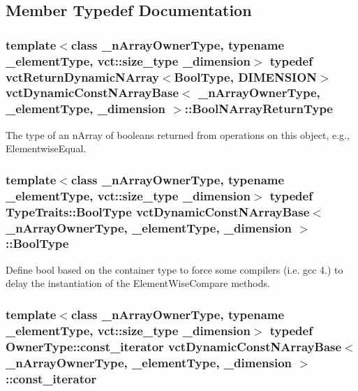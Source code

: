 \subsection{Member Typedef Documentation}
\hypertarget{classvct_dynamic_const_n_array_base_a983f2b7edd51a896d447383b5a5af289}{
\subsubsection[{Bool\-N\-Array\-Return\-Type}]{\setlength{\rightskip}{0pt plus 5cm}template$<$class \-\_\-n\-Array\-Owner\-Type, typename \-\_\-element\-Type, vct\-::size\-\_\-type \-\_\-dimension$>$ typedef {\bf vct\-Return\-Dynamic\-N\-Array}$<${\bf Bool\-Type}, {\bf D\-I\-M\-E\-N\-S\-I\-O\-N}$>$ {\bf vct\-Dynamic\-Const\-N\-Array\-Base}$<$ \-\_\-n\-Array\-Owner\-Type, \-\_\-element\-Type, \-\_\-dimension $>$\-::{\bf Bool\-N\-Array\-Return\-Type}}}\label{classvct_dynamic_const_n_array_base_a983f2b7edd51a896d447383b5a5af289}
The type of an n\-Array of booleans returned from operations on this object, e.\-g., Elementwise\-Equal. \hypertarget{classvct_dynamic_const_n_array_base_a16bf688936f61d1298ced8f637cfc1f8}{
\subsubsection[{Bool\-Type}]{\setlength{\rightskip}{0pt plus 5cm}template$<$class \-\_\-n\-Array\-Owner\-Type, typename \-\_\-element\-Type, vct\-::size\-\_\-type \-\_\-dimension$>$ typedef {\bf Type\-Traits\-::\-Bool\-Type} {\bf vct\-Dynamic\-Const\-N\-Array\-Base}$<$ \-\_\-n\-Array\-Owner\-Type, \-\_\-element\-Type, \-\_\-dimension $>$\-::{\bf Bool\-Type}}}\label{classvct_dynamic_const_n_array_base_a16bf688936f61d1298ced8f637cfc1f8}
Define bool based on the container type to force some compilers (i.\-e. gcc 4.) to delay the instantiation of the Element\-Wise\-Compare methods. \hypertarget{classvct_dynamic_const_n_array_base_a026881a1dc4be02626681c9c3056395b}{
\subsubsection[{const\-\_\-iterator}]{\setlength{\rightskip}{0pt plus 5cm}template$<$class \-\_\-n\-Array\-Owner\-Type, typename \-\_\-element\-Type, vct\-::size\-\_\-type \-\_\-dimension$>$ typedef Owner\-Type\-::const\-\_\-iterator {\bf vct\-Dynamic\-Const\-N\-Array\-Base}$<$ \-\_\-n\-Array\-Owner\-Type, \-\_\-element\-Type, \-\_\-dimension $>$\-::{\bf const\-\_\-iterator}}}\label{classvct_dynamic_const_n_array_base_a026881a1dc4be02626681c9c3056395b}
